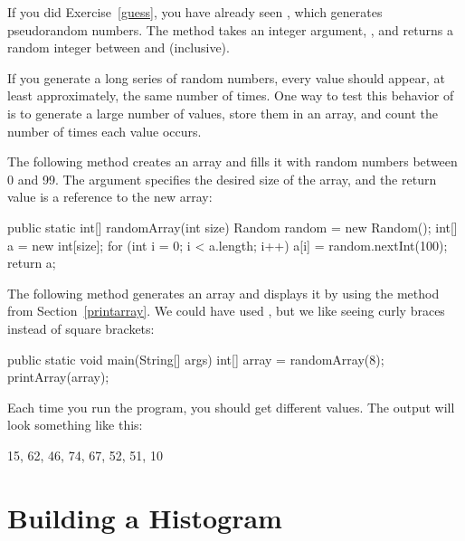 

If you did Exercise~\ref{guess}, you have already seen , which generates pseudorandom numbers.
The method  takes an integer argument, , and returns a random integer between  and  (inclusive).

If you generate a long series of random numbers, every value should appear, at least approximately, the same number of times.
One way to test this behavior of  is to generate a large number of values, store them in an array, and count the number of times each value occurs.

The following method creates an  array and fills it with random numbers between 0 and 99.
The argument specifies the desired size of the array, and the return value is a reference to the new array:

\begin{code}
public static int[] randomArray(int size) {
    Random random = new Random();
    int[] a = new int[size];
    for (int i = 0; i < a.length; i++) {
        a[i] = random.nextInt(100);
    }
    return a;
}
\end{code}

The following  method generates an array and displays it by using the  method from Section~\ref{printarray}.
We could have used , but we like seeing curly braces instead of square brackets:

\begin{code}
public static void main(String[] args) {
    int[] array = randomArray(8);
    printArray(array);
}
\end{code}

Each time you run the program, you should get different values.
The output will look something like this:

\begin{stdout}
{15, 62, 46, 74, 67, 52, 51, 10}
\end{stdout}


\section{Building a Histogram}
\label{singlepass}


